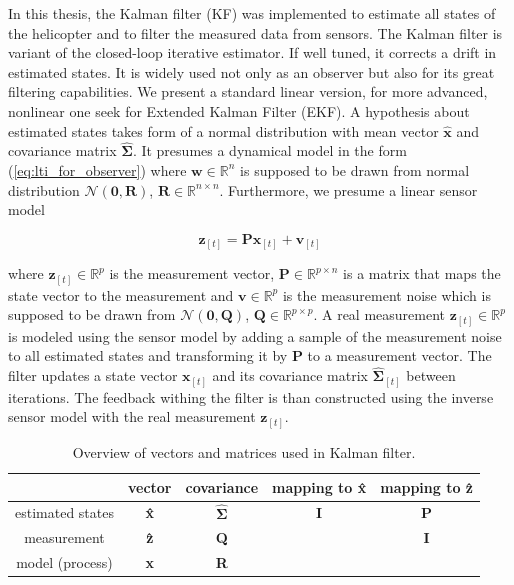 In this thesis, the Kalman filter (KF) was implemented to estimate all states of the helicopter and to filter the measured data from sensors. The Kalman filter is variant of the closed-loop iterative estimator. If well tuned, it corrects a drift in estimated states. It is widely used not only as an observer but also for its great filtering capabilities. We present a standard linear version, for more advanced, nonlinear one seek for Extended Kalman Filter (EKF). A hypothesis about estimated states takes form of a normal distribution with mean vector $\hat{\textbf{x}}$ and covariance matrix $\hat{\boldsymbol{\Sigma}}$. It presumes a dynamical model in the form (\ref{eq:lti_for_observer}) where $\textbf{w} \in \mathbb{R}^n$ is supposed to be drawn from normal distribution $\mathcal{N}(\textbf{0}, \textbf{R})$, $\textbf{R} \in \mathbb{R}^{n\times n}$. Furthermore, we presume a linear sensor model

\begin{equation}
\textbf{\^z}_{[t]} = \textbf{P}\textbf{\^x}_{[t]} + \textbf{v}_{[t]}
\end{equation}

where $\textbf{\^z}_{[t]} \in \mathbb{R}^p$ is the measurement vector, $\textbf{P} \in \mathbb{R}^{p \times n}$ is a matrix that maps the state vector to the measurement and $\textbf{v} \in \mathbb{R}^p$ is the measurement noise which is supposed to be drawn from $\mathcal{N}(\textbf{0}, \textbf{Q})$, $\textbf{Q} \in \mathbb{R}^{p \times p}$. A real measurement $\textbf{z}_{[t]} \in \mathbb{R}^p$ is modeled using the sensor model by adding a sample of the measurement noise to all estimated states and transforming it by \textbf{P} to a measurement vector. The filter updates a state vector $\textbf{\^x}_{[t]}$ and its covariance matrix $\hat{\boldsymbol{\Sigma}}_{[t]}$ between iterations. The feedback withing the filter is than constructed using the inverse sensor model with the real measurement $\textbf{z}_{[t]}$.

\begin{table}[h]
\centering
\begin{tabular}{ccccc}
\hline
& vector & covariance & mapping to \textbf{\^x} & mapping to \textbf{\^z}\\
\hline
estimated states & \textbf{\^x} & $\hat{\boldsymbol{\Sigma}}$ & \textbf{I} & \textbf{P}\\
measurement & \textbf{\^z} & \textbf{Q} & & \textbf{I}\\
model (process) & \textbf{x} & \textbf{R} & & \\
\hline
\end{tabular}
\caption{Overview of vectors and matrices used in Kalman filter.}
\label{tab:matrices_in_kalman}
\end{table}

